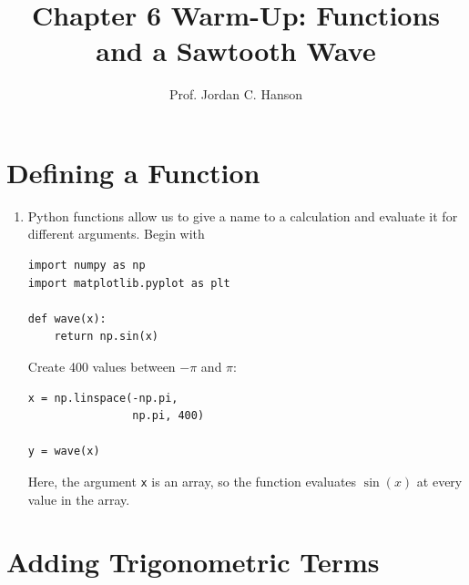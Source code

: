 \documentclass{article}
\begin{document}
\twocolumn

\title{Chapter 6 Warm-Up: Functions and a Sawtooth Wave}
\author{Prof. Jordan C. Hanson}
\date{}

\maketitle

\section{Defining a Function}

\begin{enumerate}

\item Python functions allow us to give a name to a calculation and
evaluate it for different arguments.  Begin with

\begin{verbatim}
import numpy as np
import matplotlib.pyplot as plt

def wave(x):
    return np.sin(x)
\end{verbatim}

Create 400 values between $-\pi$ and $\pi$:

\begin{verbatim}
x = np.linspace(-np.pi,
                np.pi, 400)

y = wave(x)
\end{verbatim}

Here, the argument \texttt{x} is an array, so the function evaluates
$\sin(x)$ at every value in the array.

\end{enumerate}


\section{Adding Trigonometric Terms}
\end{document}
